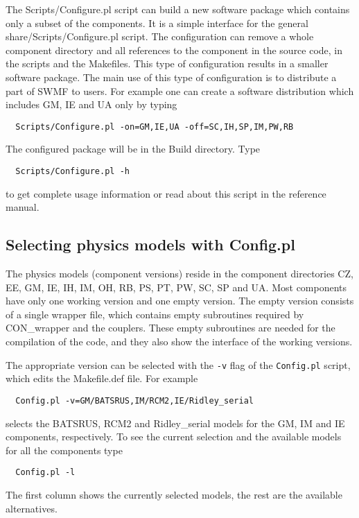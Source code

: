 The Scripts/Configure.pl script can build a new software package which
contains only a subset of the components. It is a simple interface
for the general share/Scripts/Configure.pl script. The configuration
can remove a whole component directory and all references to the component 
in the source code, in the scripts and the Makefiles.
This type of configuration results in a smaller software package.
The main use of this type of configuration is to distribute
a part of SWMF to users. For example one can create a 
software distribution which includes GM, IE and UA only by typing
\begin{verbatim}
  Scripts/Configure.pl -on=GM,IE,UA -off=SC,IH,SP,IM,PW,RB
\end{verbatim}
The configured package will be in the Build directory.  Type
\begin{verbatim}
  Scripts/Configure.pl -h
\end{verbatim}
to get complete usage information or read about this script 
in the reference manual.

\subsection{Selecting physics models with Config.pl}

The physics models (component versions) reside in the component 
directories CZ, EE, GM, IE, IH, IM, OH, RB, PS, PT, PW, SC, SP and UA.
Most components have only one working version and one empty version.
The empty version consists of a single wrapper file, which contains 
empty subroutines required by CON\_wrapper and the couplers.
These empty subroutines are needed for the compilation of the code,
and they also show the interface of the working versions.

The appropriate version can be selected with the {\tt -v} flag
of the {\tt Config.pl} script, which edits the Makefile.def file.
For example
\begin{verbatim}
  Config.pl -v=GM/BATSRUS,IM/RCM2,IE/Ridley_serial
\end{verbatim}
selects the BATSRUS, RCM2 and Ridley\_serial models for
the GM, IM and IE components, respectively.
To see the current selection and the available models for all
the components type
\begin{verbatim}
  Config.pl -l
\end{verbatim}
The first column shows the currently selected models, the rest are the 
available alternatives.

